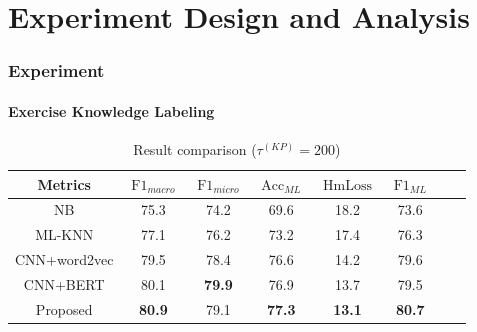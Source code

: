 \documentclass{beamer}
\begin{document}
\section{Experiment Design and Analysis}
\begin{frame}
  \frametitle{Experiment}
  \framesubtitle{Exercise Knowledge Labeling}
  \begin{table}[htbp!]
    \caption{Result comparison (\(\tau^{(KP)}=200 \))}\label{tbl:bsline1}
    \centering
    \begin{tabular}{cccccccc}
      \toprule
      Metrics      & \(\operatorname{F1}_{macro}\) & \(\operatorname{F1}_{micro}\) & \(\operatorname{Acc}_{ML}\) & \(\operatorname{HmLoss}\) & \(\operatorname{F1}_{ML}\) \\
      \midrule
      NB           & 75.3                          & 74.2                          & 69.6                        & 18.2                      & 73.6                       \\
      ML-KNN       & 77.1                          & 76.2                          & 73.2                        & 17.4                      & 76.3                       \\
      CNN+word2vec & 79.5                          & 78.4                          & 76.6                        & 14.2                      & 79.6                       \\
      CNN+BERT     & 80.1                          & \textbf{79.9}                 & 76.9                        & 13.7                      & 79.5                       \\
      Proposed     & \textbf{80.9}                 & 79.1                          & \textbf{77.3}               & \textbf{13.1}             & \textbf{80.7}              \\
      \bottomrule
    \end{tabular}
  \end{table}
\end{frame}
\end{document}
